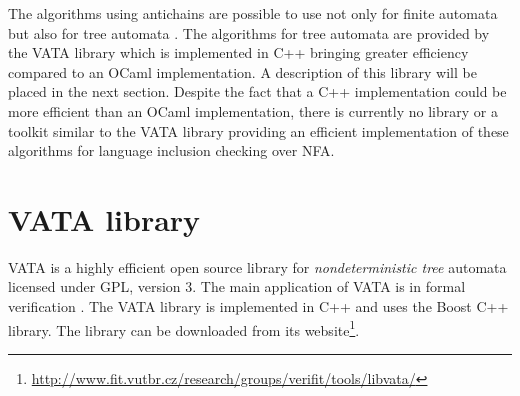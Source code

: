 The algorithms using antichains are possible to use not only for finite automata but also for tree automata \cite{cav06,tacas10}. 
The algorithms for tree automata are provided by the VATA library which is implemented in C++ bringing greater efficiency compared to an OCaml implementation. 
A description of this library will be placed in the next section.
Despite the fact that a C++ implementation could be more efficient than an OCaml implementation, there is currently 
no library or a toolkit similar to the VATA library providing an efficient implementation of these algorithms for language inclusion checking over NFA.

\section{VATA library}
\label{VATA}
VATA is a highly efficient open source library for \emph{nondeterministic tree} automata licensed under GPL, version 3. 
The main application of VATA is in formal verification \cite{libvata}.
The VATA library is implemented in C++ and uses the Boost C++ library. 
The library can be downloaded from its website\footnote{\url{http://www.fit.vutbr.cz/research/groups/verifit/tools/libvata/}}.  

